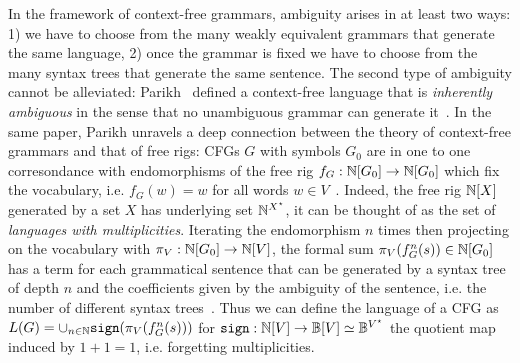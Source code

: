 In the framework of context-free grammars, ambiguity arises in at least two ways: 1) we have to choose from the many weakly equivalent grammars that generate the same language, 2) once the grammar is fixed we have to choose from the many syntax trees that generate the same sentence.
The second type of ambiguity cannot be alleviated: Parikh~\cite{Parikh61,Parikh66} defined a context-free language that is \emph{inherently ambiguous} in the sense that no unambiguous grammar can generate it~\cite[Theorem~29]{Chomsky63}.
In the same paper, Parikh unravels a deep connection between the theory of context-free grammars and that of free rigs: CFGs $G$ with symbols $G_0$ are in one to one corresondance with endomorphisms of the free rig $f_G : \mathbb{N}[G_0] \to \mathbb{N}[G_0]$ which fix the vocabulary, i.e. $f_G(w) = w$ for all words $w \in V$~\cite[Section~3]{Parikh66}.
Indeed, the free rig $\mathbb{N}[X]$ generated by a set $X$ has underlying set $\mathbb{N}^{X^\star}$, it can be thought of as the set of \emph{languages with multiplicities}.
Iterating the endomorphism $n$ times then projecting on the vocabulary with $\pi_V : \mathbb{N}[G_0] \to \mathbb{N}[V]$, the formal sum $\pi_V(f_G^n(s)) \in \mathbb{N}[G_0]$ has a term for each grammatical sentence that can be generated by a syntax tree of depth $n$ and the coefficients given by the ambiguity of the sentence, i.e. the number of different syntax trees~\cite{MichaelisKracht97}.
Thus we can define the language of a CFG as $L(G) = \cup_{n \in \mathbb{N}} \mathtt{sign}(\pi_V(f_G^n(s)))$ for $\mathtt{sign} : \mathbb{N}[V] \to \mathbb{B}[V] \simeq \mathbb{B}^{V^\star}$ the quotient map induced by $1 + 1 = 1$, i.e. forgetting multiplicities.

